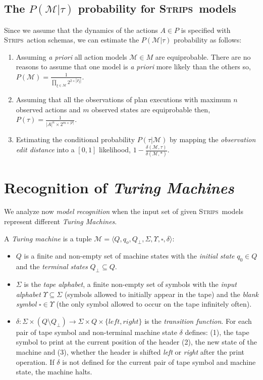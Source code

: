 \documentclass[letterpaper]{article} %
\newcommand{\tup}[1]{{\langle #1 \rangle}}
\newcommand{\strips}{\textsc{Strips}}     %
\begin{document}
\subsection{The $P(\mathcal{M}|\tau)$ probability for \strips\ models}
Since we assume that the dynamics of the actions $A\in P$ is specified with \strips\ action schemas, we can estimate the $P(\mathcal{M}|\tau)$ probability as follows:
\begin{enumerate}
\item Assuming {\em a priori} all action models $\mathcal{M}\in M$ are equiprobable. There are no reasons to assume that one model is {\em a priori} more likely than the others so, $P(\mathcal{M})=\frac{1}{\prod_{\xi\in\mathcal{M}} 2^{2\times|F_{\xi}|}}$.
\item Assuming that all the observations of plan executions with maximum $n$ observed actions and $m$ observed states are equiprobable then, $P(\tau)=\frac{1}{|A|^{n}\times2^{m\times|F|}}$.
\item Estimating the conditional probability $P(\tau|\mathcal{M})$ by mapping the {\em observation edit distance} into a $[0,1]$ likelihood, $1-\frac{\delta(\mathcal{M},\tau)}{\delta(\mathcal{M},*)}$.
\end{enumerate}


\section{Recognition of {\em Turing Machines}}
\label{sec:asPlanning}
We analyze now {\em model recognition} when the input set of given \strips\ models represent different {\em Turing Machines}.

A {\em Turing machine} is a tuple $\mathcal{M}=\tup{Q,q_o,Q_{\bot},\Sigma,\Upsilon,\square,\delta}$:
\begin{itemize}
\item $Q$ is a finite and non-empty set of machine states with the {\em initial state} $q_0\in Q$ and the {\em terminal states} $Q_{\bot}\subseteq Q$.  
\item $\Sigma$ is the {\em tape alphabet}, a finite non-empty set of symbols with the {\em input alphabet} $\Upsilon\subseteq\Sigma$ (symbols allowed to initially appear in the tape) and the {\em blank symbol} $\square\in\Upsilon$ (the only symbol allowed to occur on the tape infinitely often).
\item $\delta: \Sigma\times (Q\setminus Q_{\bot}) \rightarrow \Sigma\times Q\times\{left,right\}$ is the {\em transition function}. For each pair of tape symbol and non-terminal machine state $\delta$ defines: (1), the tape symbol to print at the current position of the header (2), the new state of the machine and (3), whether the header is shifted {\em left} or {\em right} after the print operation. If $\delta$ is not defined for the current pair of tape symbol and machine state, the machine halts.
\end{itemize}
\end{document}
